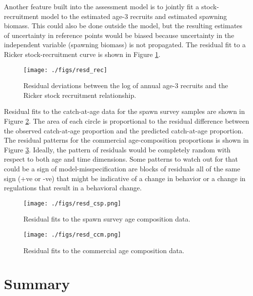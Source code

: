 \documentclass[12pt,letterpaper]{article}
\begin{document}
  Another feature built into the assessment model is to jointly fit a stock-recruitment model to the estimated age-3 recruits and estimated spawning biomass.  This could also be done outside the model, but the resulting estimates of uncertainty in reference points would be biased because uncertainty in the independent variable (spawning biomass) is not propagated. The residual fit to a Ricker stock-recruitment curve is shown in Figure \ref{fig:resd_rec}.


  \begin{figure}[tb]
    \centering
    \texttt{[image: ./figs/resd\_rec]}
    \caption{Residual deviations between the log of annual age-3 recruits and the Ricker stock recruitment relationship.}
    \label{fig:resd_rec}
  \end{figure}

  Residual fits to the catch-at-age data for the spawn survey samples are shown in Figure \ref{fig:resd_csp}.  The area of each circle is proportional to the residual difference between the observed catch-at-age proportion and the predicted catch-at-age proportion. The residual patterns for the commercial age-composition proportions is shown in Figure \ref{fig:resd_ccm}. Ideally, the pattern of residuals would be completely random with respect to both age and time dimensions.  Some patterns to watch out for that could be a sign of model-misspecification are blocks of residuals all of the same sign (+ve or -ve) that might be indicative of a change in behavior or a change in regulations that result in a behavioral change.

  \begin{figure}[tb]
    \centering
    \texttt{[image: ./figs/resd\_csp.png]}
    \caption{Residual fits to the spawn survey age composition data.}
    \label{fig:resd_csp}
  \end{figure}


  \begin{figure}[tb]
    \centering
    \texttt{[image: ./figs/resd\_ccm.png]}
    \caption{Residual fits to the commercial age composition data.}
    \label{fig:resd_ccm}
  \end{figure}

  
  \clearpage


  \section{Summary} %
\end{document}
